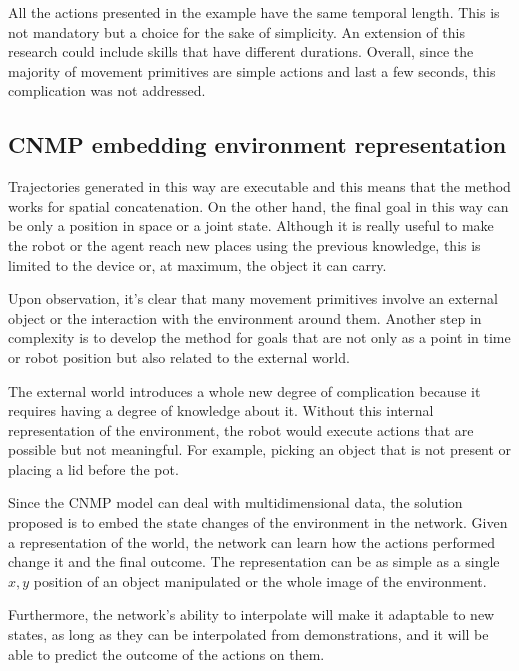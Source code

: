 All the actions presented in the example have the same temporal length. This is not mandatory but a choice for the sake of simplicity. An extension of this research could include skills that have different durations. Overall, since the majority of movement primitives are simple actions and last a few seconds, this complication was not addressed.  

\subsection{CNMP embedding environment representation}
Trajectories generated in this way are executable and this means that the method works for spatial concatenation. 
On the other hand,  the final goal in this way can be only a position in space or a joint state. 
Although it is really useful to make the robot or the agent reach new places using the previous knowledge, this is limited to the device or, at maximum, the object it can carry.

Upon observation, it's clear that many movement primitives involve an external object or the interaction with the environment around them. Another step in complexity is to develop the method for goals that are not only as a point in time or robot position but also related to the external world. 

The external world introduces a whole new degree of complication because it requires having a degree of knowledge about it. Without this internal representation of the environment, the robot would execute actions that are possible but not meaningful. For example, picking an object that is not present or placing a lid before the pot. 

Since the CNMP model can deal with multidimensional data, the solution proposed is to embed the state changes of the environment in the network. Given a representation of the world, the network can learn how the actions performed change it and the final outcome. The representation can be as simple as a single $x,y$ position of an object manipulated or the whole image of the environment. 

Furthermore, the network's ability to interpolate will make it adaptable to new states, as long as they can be interpolated from demonstrations, and it will be able to predict the outcome of the actions on them. 

